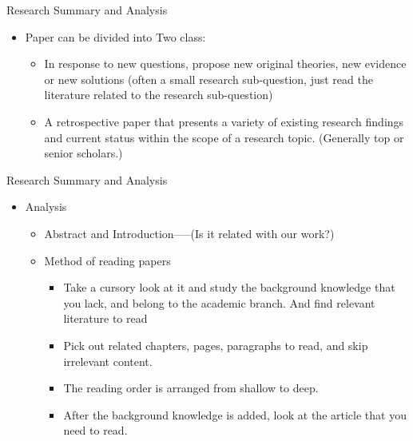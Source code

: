 \documentclass[
 size=14pt,
 paper=smartboard,  %
 mode=present, 		%
 display=slides, 	%
 style=tuliplab,  	%
 pauseslide,
 fleqn,leqno]{powerdot}{}
\begin{document}
\begin{slide}{Research Summary and Analysis}

\begin{itemize}
  \item Paper can be divided into Two class:
  \begin{itemize}
    \item  In response to new questions, propose new original theories, new evidence or new solutions (often a small research sub-question, just read the literature related to the research sub-question)
    \item  A retrospective paper that presents a variety of existing research findings and current status within the scope of a research topic. (Generally top or senior scholars.)
  \end{itemize}
\end{itemize}
\end{slide}

\begin{slide}[toc=,bm=]{Research Summary and Analysis}

\begin{itemize}
  \item Analysis
  \begin{itemize}
    \item  Abstract and Introduction-----(Is it related with our work?)
    \item Method of reading papers
    \begin{itemize}
      \item Take a cursory look at it and study the background knowledge that you lack, and belong to the academic branch. And find relevant literature to read
      \item  Pick out related chapters, pages, paragraphs to read, and skip irrelevant content.
      \item The reading order is arranged from shallow to deep.
      \item After the background knowledge is added, look at the article that you need to read.
    \end{itemize}
  \end{itemize}
\end{itemize}
\end{slide}
\end{document}

